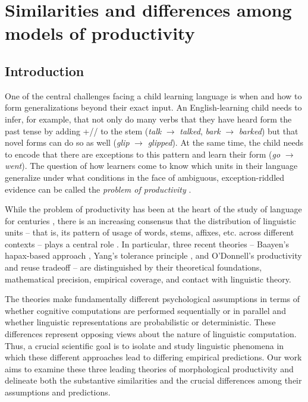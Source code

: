 \documentclass[
   11pt,
       ]{book}
\begin{document}
\hypertarget{prod-comp}{%
\chapter{Similarities and differences among models of productivity}\label{prod-comp}}

\hypertarget{introduction-2}{%
\section{Introduction}\label{introduction-2}}

One of the central challenges facing a child learning language is when and how
to form generalizations beyond their exact input. An English-learning child
needs to infer, for example, that not only do many verbs that they have heard
form the past tense by adding +// to the stem (\emph{talk} \(\rightarrow\)
\emph{talked}, \emph{bark} \(\rightarrow\) \emph{barked}) but that novel forms can do so as well
(\emph{glip} \(\rightarrow\) \emph{glipped}). At the same time, the child needs to encode
that there are exceptions to this pattern and learn their form (\emph{go}
\(\rightarrow\) \emph{went}). The question of how learners come to know which units in
their language generalize under what conditions in the face of ambiguous,
exception-riddled evidence can be called the \emph{problem of productivity}
\citep{odonnell2015}.

While the problem of productivity has been at the heart of the study of language
for centuries \citep{bauer2001}, there is an increasing consensus that the
distribution of linguistic units -- that is, its pattern of usage of words,
stems, affixes, etc. across different contexts -- plays a central role
\citep{baayen2009, bauer2005, odonnell2015, yang2016}. In particular, three recent
theories -- Baayen's hapax-based approach \citep{baayen1993, baayen2001, baayen2009}, Yang's tolerance principle \citep{yang2005, yang2010, yang2016}, and
O'Donnell's productivity and reuse tradeoff \citep{odonnell2011, odonnell2015, odonnell2009} -- are distinguished by their theoretical foundations,
mathematical precision, empirical coverage, and contact with linguistic theory.

The theories make fundamentally different psychological assumptions in terms of
whether cognitive computations are performed sequentially or in parallel and
whether linguistic representations are probabilistic or deterministic. These
differences represent opposing views about the nature of linguistic computation.
Thus, a crucial scientific goal is to isolate and study linguistic phenomena in
which these different approaches lead to differing empirical predictions. Our
work aims to examine these three leading theories of morphological productivity
and delineate both the substantive similarities and the crucial differences
among their assumptions and predictions.
\end{document}
